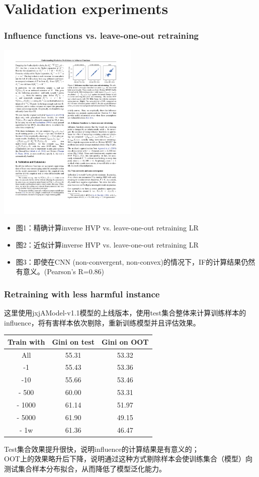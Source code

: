 \documentclass[UTF8]{beamer}
\begin{document}
\section{Validation experiments}
\frame{\tableofcontents[currentsection, sectionstyle=show/shaded]}
\begin{frame}
\frametitle{Influence functions vs. leave-one-out retraining}
\begin{center}
\includegraphics[width=0.5\textwidth]{corr.pdf}
\end{center}
\begin{itemize}
\item 图1：精确计算inverse HVP vs. leave-one-out retraining LR
\item 图2：近似计算inverse HVP vs. leave-one-out retraining LR
\item 图3：即使在CNN (non-convergent, non-convex)的情况下，IF的计算结果仍然有意义。(Pearson's R=0.86)
\end{itemize}
\end{frame}

\begin{frame}
\frametitle{Retraining with less harmful instance}
这里使用jxjAModel-v1.1模型的上线版本，使用test集合整体来计算训练样本的influence，将有害样本依次剔除，重新训练模型并且评估效果。
\begin{center}
\begin{tabular}{ | c | c | c | }
  \hline
  Train with & Gini on test & Gini on OOT \\ \hline            
  All & 55.31 & 53.32 \\ \hline      
  -1 & 55.43 & 53.36 \\ \hline      
  -10 & 55.66 & 53.46 \\ \hline
  - 500 & 60.00 & 53.31 \\ \hline
  - 1000 & 61.14 & 51.97 \\ \hline
  - 5000 & 61.90 & 49.15 \\ \hline
  - 1w & 61.36 & 46.47 \\ \hline
\end{tabular}
\end{center}
Test集合效果提升很快，说明influence的计算结果是有意义的；\\
OOT上的效果略升后下降，说明通过这种方式剔除样本会使训练集合（模型）向测试集合样本分布拟合，从而降低了模型泛化能力。
\end{frame}
\end{document}
